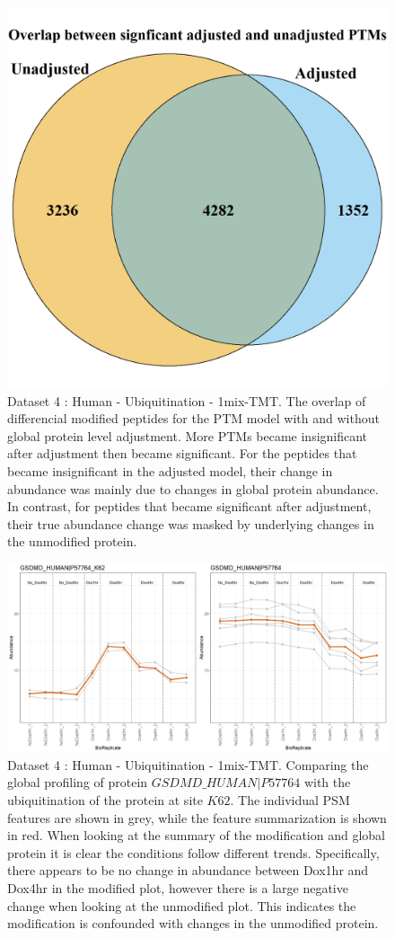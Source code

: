 \documentclass[mcp]{article}
\numberwithin{figure}{section} %
\numberwithin{table}{section}
\begin{document}
\begin{figure}[ht]
\centering
\includegraphics[height=.65\textwidth]{images/ipah_venn_diagramm.png}
\caption{Dataset 4 : Human - Ubiquitination - 1mix-TMT. The overlap of differencial modified peptides for the PTM model with and without global protein level adjustment. More PTMs became insignificant after adjustment then became significant. For the peptides that became insignificant in the adjusted model, their change in abundance was mainly due to changes in global protein abundance. In contrast, for peptides that became significant after adjustment, their true abundance change was masked by underlying changes in the unmodified protein.}
\label{fig:ipah_venn_diagramm}
\end{figure}

\begin{figure}[ht]
\centering
\includegraphics[width=1\textwidth]{images/IpaH_prof_plot.png}
\caption{Dataset 4 : Human - Ubiquitination - 1mix-TMT. Comparing the global profiling of protein $GSDMD\_HUMAN|P57764$ with the ubiquitination of the protein at site $K62$. The individual PSM features are shown in grey, while the feature summarization is shown in red. When looking at the summary of the modification and global protein it is clear the conditions follow different trends. Specifically, there appears to be no change in abundance between Dox1hr and Dox4hr in the modified plot, however there is a large negative change when looking at the unmodified plot. This indicates the modification is confounded with changes in the unmodified protein.}
\label{fig:ipah_profile}
\end{figure}
\end{document}
